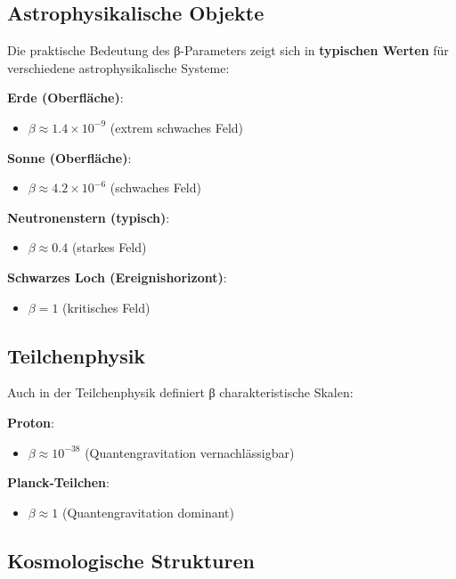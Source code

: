 \documentclass[12pt,a4paper]{report}
\begin{document}
\subsection{Astrophysikalische Objekte}

Die praktische Bedeutung des β-Parameters zeigt sich in \textbf{typischen Werten} für verschiedene astrophysikalische Systeme:

\textbf{Erde (Oberfläche)}:
\begin{itemize}
	\item $\beta \approx 1.4 \times 10^{-9}$ (extrem schwaches Feld)
\end{itemize}

\textbf{Sonne (Oberfläche)}:
\begin{itemize}
	\item $\beta \approx 4.2 \times 10^{-6}$ (schwaches Feld)
\end{itemize}

\textbf{Neutronenstern (typisch)}:
\begin{itemize}
	\item $\beta \approx 0.4$ (starkes Feld)
\end{itemize}

\textbf{Schwarzes Loch (Ereignishorizont)}:
\begin{itemize}
	\item $\beta = 1$ (kritisches Feld)
\end{itemize}

\subsection{Teilchenphysik}

Auch in der Teilchenphysik definiert β charakteristische Skalen:

\textbf{Proton}:
\begin{itemize}
	\item $\beta \approx 10^{-38}$ (Quantengravitation vernachlässigbar)
\end{itemize}

\textbf{Planck-Teilchen}:
\begin{itemize}
	\item $\beta \approx 1$ (Quantengravitation dominant)
\end{itemize}

\subsection{Kosmologische Strukturen}
\end{document}
